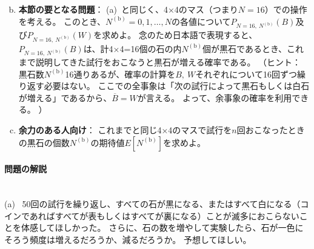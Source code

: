 \documentclass[luatexja,fontsize=12pt]{jlreq}\usepackage{ifthen}\newcounter{enlarge}\setcounter{enlarge}{1}
\begin{document}
\begin{enumerate}[(a)~] \setcounter{enumi}{1}
\item \textbf{本節の要となる問題}：
(a)~と同じく、4×4のマス（つまり$N=16$）での操作を考える。
このとき、$N^\mathrm{(b)} = 0, 1, \dots ,N $の各値について$P_{N = 16,~N^\mathrm{(b)}} (B)$及び$P_{N = 16,~N^\mathrm{(b)}} (W)$を求めよ。
念のため日本語で表現すると、$P_{N = 16,~N^\mathrm{(b)}} (B)$は、計4×4=16個の石の内$N^\mathrm{(b)}$個が黒石であるとき、これまで説明してきた試行をおこなうと黒石が増える確率である。
（ヒント：
黒石数$N^\mathrm{(b)}$16通りあるが、確率の計算を$B,~W$それぞれについて16回ずつ繰り返す必要はない。
ここでの全事象は「次の試行によって黒石もしくは白石が増える」であるから、$\overline{B} = W$が言える。
よって、余事象の確率を利用できる。
）
\item \textbf{余力のある人向け}：
これまでと同じ4×4のマスで試行を$n$回おこなったときの黒石の個数$N^\mathrm{(b)}$の期待値$E [ N^\mathrm{(b)} ]$を求めよ。
\end{enumerate}

\paragraph{問題の解説}
\mbox{}\\
\indent
(a)~
50回の試行を繰り返し、すべての石が黒になる、またはすべて白になる（コインであればすべてが表もしくはすべてが裏になる）ことが滅多におこらないことを体感してほしかった。
さらに、石の数を増やして実験したら、石が一色にそろう頻度は増えるだろうか、減るだろうか。
予想してほしい。
\end{document}
